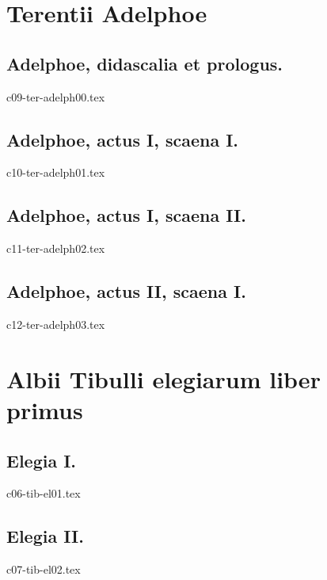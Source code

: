\documentclass[a4paper,12pt,twoside]{book}
\begin{document}
{\part{Terentii Adelphoe}

\chapter{Adelphoe, didascalia et prologus.}


{c09-ter-adelph00.tex}

\chapter{Adelphoe, actus I, scaena I.}


{c10-ter-adelph01.tex}

\chapter{Adelphoe, actus I, scaena II.}


{c11-ter-adelph02.tex}

\chapter{Adelphoe, actus II, scaena I.}


{c12-ter-adelph03.tex}


\part{Albii Tibulli elegiarum liber primus}

\chapter{Elegia I.}


{c06-tib-el01.tex}

\chapter{Elegia II.}


{c07-tib-el02.tex}







}
\end{document}
